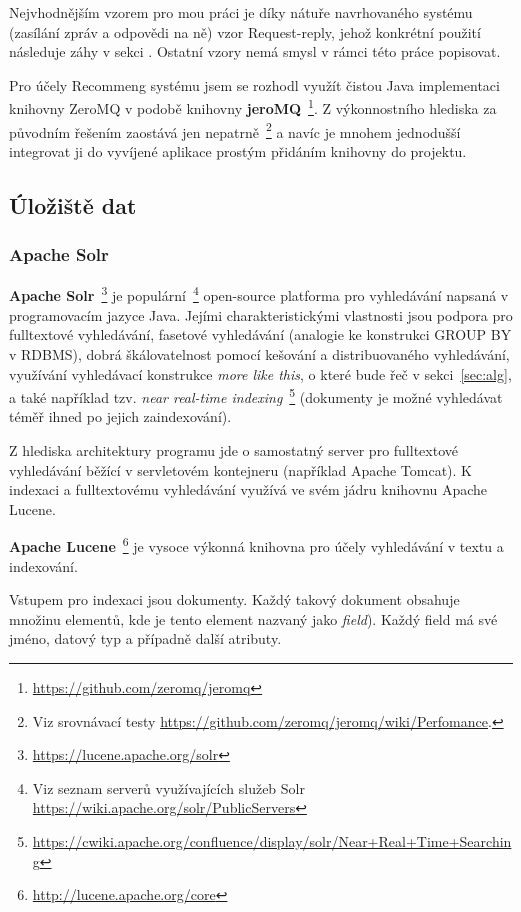 \documentclass[thesis=M,czech]{FITthesis}[2014/05/07]
\begin{document}
Nejvhodnějším vzorem pro mou práci je díky nátuře navrhovaného systému (zasílání zpráv a odpovědi na ně) vzor Request-reply, jehož konkrétní použití následuje záhy v sekci . Ostatní vzory nemá smysl v rámci této práce popisovat.

Pro účely Recommeng systému jsem se rozhodl využít čistou Java implementaci knihovny ZeroMQ v podobě knihovny \textbf{jeroMQ}~\footnote{\url{https://github.com/zeromq/jeromq}}. Z výkonnostního hlediska za původním řešením zaostává jen nepatrně~\footnote{Viz srovnávací testy \url{https://github.com/zeromq/jeromq/wiki/Perfomance}.} a navíc je mnohem jednodušší integrovat ji do vyvíjené aplikace prostým přidáním knihovny do projektu.

\subsection{Úložiště dat}

\subsubsection{Apache Solr}
\textbf{Apache Solr}~\footnote{\url{https://lucene.apache.org/solr}} je populární~\footnote{Viz seznam serverů využívajících služeb Solr \url{https://wiki.apache.org/solr/PublicServers}} open-source platforma pro vyhledávání napsaná v programovacím jazyce Java. Jejími charakteristickými vlastnosti jsou podpora pro fulltextové vyhledávání, fasetové vyhledávání (analogie ke konstrukci GROUP BY v RDBMS), dobrá škálovatelnost pomocí kešování a distribuovaného vyhledávání, využívání vyhledávací konstrukce \emph{more like this}, o které bude řeč v sekci~\ref{sec:alg}, a také například tzv. \emph{near real-time indexing}~\footnote{\url{https://cwiki.apache.org/confluence/display/solr/Near+Real+Time+Searching}} (dokumenty je možné vyhledávat téměř ihned po jejich zaindexování).

Z hlediska architektury programu jde o samostatný server pro fulltextové vyhledávání běžící v servletovém kontejneru (například Apache Tomcat). K indexaci a fulltextovému vyhledávání využívá ve svém jádru knihovnu Apache Lucene. 

\textbf{Apache Lucene}~\footnote{\url{http://lucene.apache.org/core}} je vysoce výkonná knihovna pro účely vyhledávání v textu a indexování.

Vstupem pro indexaci jsou dokumenty. Každý takový dokument obsahuje množinu elementů, kde je tento element nazvaný jako \emph{field}). Každý field má své jméno, datový typ a případně další atributy.
\end{document}
